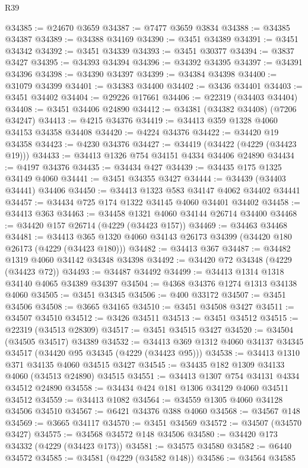 \begin{lexlean}{R39}
\begin{coremodule}
@34385 := @24670 @3659
@34387 := @7477 @3659 @3834
@34388 := @34385 @34387
@34389 := @34388 @34169
@34390 := @3451 @34389
@34391 := @3451 @34342
@34392 := @3451 @34339
@34393 := @3451 @30377
@34394 := @3837 @3427
@34395 := @34393 @34394
@34396 := @34392 @34395
@34397 := @34391 @34396
@34398 := @34390 @34397
@34399 := @34384 @34398
@34400 := @31079 @34399
@34401 := @34383 @34400
@34402 := @3436 @34401
@34403 := @3451 @34402
@34404 := @29226 @17661
@34406 := @22319 (@34403 @34404)
@34408 := @3451 @34406 @24890
@34412 := @34381 (@34382 @34408) (@7206 @34247)
@34413 := @4215 @34376
@34419 := @34413 @359 @1328 @4060 @34153 @34358 @34408
@34420 := @4224 @34376
@34422 := @34420 @19 @34358
@34423 := @4230 @34376
@34427 := @34419 (@34422 (@4229 (@34423 @19)))
@34433 := @34413 @1326 @754 @34151 @4334 @34406 @24890
@34434 := @4197 @34376
@34435 := @34434 @427
@34439 := @34435 @175 @1325 @34149 @4060
@34441 := @3451 @34355 @3427
@34444 := @34439 (@34403 @34441) @34406
@34450 := @34413 @1323 @583 @34147 @4062 @34402 @34441
@34457 := @34434 @725 @174 @1322 @34145 @4060 @34401 @34402
@34458 := @34413 @363
@34463 := @34458 @1321 @4060 @34144 @26714 @34400
@34468 := @34420 @157 @26714 (@4229 (@34423 @157))
@34469 := @34463 @34468
@34481 := @34413 @365 @1320 @4060 @34143 @26173 @34399 (@34420 @180 @26173 (@4229 (@34423 @180)))
@34482 := @34413 @367
@34487 := @34482 @1319 @4060 @34142 @34348 @34398
@34492 := @34420 @72 @34348 (@4229 (@34423 @72))
@34493 := @34487 @34492
@34499 := @34413 @1314 @1318 @34140 @4065 @34389 @34397
@34504 := @4368 @34376 @1274 @1313 @34138 @4060
@34505 := @3451 @34345
@34506 := @400 @33172
@34507 := @3451 @34506
@34508 := @3665 @34165
@34510 := @3451 @34508 @3427
@34511 := @34507 @34510
@34512 := @3426 @34511
@34513 := @3451 @34512
@34515 := @22319 (@34513 @28309)
@34517 := @3451 @34515 @3427
@34520 := @34504 (@34505 @34517) @34389
@34532 := @34413 @369 @1312 @4060 @34137 @34345 @34517 (@34420 @95 @34345 (@4229 (@34423 @95)))
@34538 := @34413 @1310 @371 @34135 @4060 @34515 @3427
@34545 := @34435 @182 @1309 @34133 @4060 (@34513 @24890) @34515
@34551 := @34413 @1307 @754 @34131 @4334 @34512 @24890
@34558 := @34434 @424 @181 @1306 @34129 @4060 @34511 @34512
@34559 := @34413 @1082
@34564 := @34559 @1305 @4060 @34128 @34506 @34510
@34567 := @6421 @34376 @388 @4060
@34568 := @34567 @148
@34569 := @3665 @34117
@34570 := @3451 @34569
@34572 := @34507 (@34570 @3427)
@34575 := @34568 @34572 @148 @34506
@34580 := @34420 @173 @34332 (@4229 (@34423 @173))
@34581 := @34575 @34580
@34582 := @6440 @34572
@34585 := @34581 (@4229 (@34582 @148))
@34586 := @34564 @34585

\end{coremodule}
\end{lexlean}
